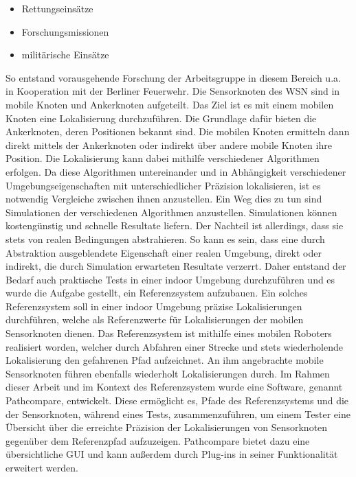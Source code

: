 \begin{itemize}
  \item Rettungseinsätze 
  \item Forschungsmissionen
  \item militärische Einsätze
\end{itemize}

So entstand vorausgehende Forschung der Arbeitsgruppe in diesem Bereich u.a. in
Kooperation mit der Berliner Feuerwehr. Die Sensorknoten des WSN sind in mobile
Knoten und Ankerknoten aufgeteilt. Das Ziel ist es mit einem mobilen Knoten
eine Lokalisierung durchzuführen. Die Grundlage dafür bieten die Ankerknoten,
deren Positionen bekannt sind. Die mobilen Knoten ermitteln dann direkt mittels
der Ankerknoten oder indirekt über andere mobile Knoten ihre Position. Die
Lokalisierung kann dabei mithilfe verschiedener Algorithmen erfolgen. Da diese
Algorithmen untereinander und in Abhängigkeit verschiedener
Umgebungseigenschaften mit unterschiedlicher Präzision lokalisieren, ist es
notwendig Vergleiche zwischen ihnen anzustellen. Ein Weg dies zu tun sind
Simulationen der verschiedenen Algorithmen anzustellen. Simulationen können
kostengünstig und schnelle Resultate liefern. Der Nachteil ist allerdings, dass
sie stets von realen Bedingungen abstrahieren. So kann es sein, dass eine durch
Abstraktion ausgeblendete Eigenschaft einer realen Umgebung, direkt oder
indirekt, die durch Simulation erwarteten Resultate verzerrt. Daher entstand
der Bedarf auch praktische Tests in einer indoor Umgebung durchzuführen und es
wurde die Aufgabe gestellt, ein Referenzsystem aufzubauen. Ein solches
Referenzsystem soll in einer indoor Umgebung präzise Lokalisierungen
durchführen, welche als Referenzwerte für Lokalisierungen der mobilen
Sensorknoten dienen. Das Referenzsystem ist mithilfe eines mobilen Roboters
realisiert worden, welcher durch Abfahren einer Strecke und stets wiederholende
Lokalisierung den gefahrenen Pfad aufzeichnet.  An ihm angebrachte mobile
Sensorknoten führen ebenfalls wiederholt Lokalisierungen durch. Im Rahmen
dieser Arbeit und im Kontext des Referenzsystem wurde eine Software, genannt 
Pathcompare, entwickelt.  Diese ermöglicht es, Pfade des Referenzsystems und
die der Sensorknoten, während eines Tests, zusammenzuführen, um einem Tester
eine Übersicht über die erreichte Präzision der Lokalisierungen von
Sensorknoten gegenüber dem Referenzpfad aufzuzeigen. Pathcompare bietet dazu
eine übersichtliche GUI und kann außerdem durch Plug-ins in seiner Funktionalität
erweitert werden.

